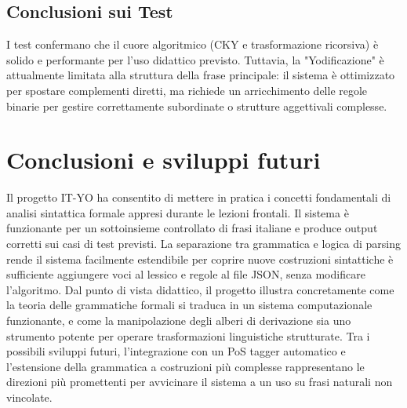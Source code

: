 \documentclass[12pt, a4paper]{article}
\begin{document}
\subsection{Conclusioni sui Test}
I test confermano che il cuore algoritmico (CKY e trasformazione ricorsiva) è solido e performante per l'uso didattico previsto. Tuttavia, la "Yodificazione" è attualmente limitata alla struttura della frase principale: il sistema è ottimizzato per spostare complementi diretti, ma richiede un arricchimento delle regole binarie per gestire correttamente subordinate o strutture aggettivali complesse.


\section{Conclusioni e sviluppi futuri}

Il progetto IT-YO ha consentito di mettere in pratica i concetti fondamentali
di analisi sintattica formale appresi durante le lezioni frontali.
Il sistema è funzionante per un sottoinsieme controllato di frasi italiane e
produce output corretti sui casi di test previsti. La separazione tra grammatica
e logica di parsing rende il sistema facilmente
estendibile per coprire nuove costruzioni sintattiche è sufficiente aggiungere
voci al lessico e regole al file JSON, senza modificare l'algoritmo.
Dal punto di vista didattico, il progetto illustra concretamente come la teoria
delle grammatiche formali si traduca in un sistema computazionale funzionante,
e come la manipolazione degli alberi di derivazione sia uno strumento potente
per operare trasformazioni linguistiche strutturate.
Tra i possibili sviluppi futuri, l'integrazione con un PoS tagger automatico e
l'estensione della grammatica a costruzioni più complesse rappresentano le
direzioni più promettenti per avvicinare il sistema a un uso su frasi naturali
non vincolate.
\end{document}
